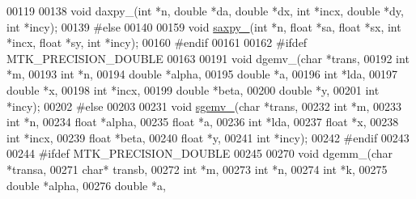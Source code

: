 \begin{DoxyCode}
00119 
00138 \textcolor{keywordtype}{void} daxpy\_(\textcolor{keywordtype}{int} *n, \textcolor{keywordtype}{double} *da, \textcolor{keywordtype}{double} *dx, \textcolor{keywordtype}{int} *incx, \textcolor{keywordtype}{double} *dy, \textcolor{keywordtype}{int} *incy);
00139 \textcolor{preprocessor}{#else}
00140 
00159 \textcolor{keywordtype}{void} \hyperlink{namespacemtk_a81a2d7d1ea9eff65ae13646c93dad5e9}{saxpy\_}(\textcolor{keywordtype}{int} *n, \textcolor{keywordtype}{float} *sa, \textcolor{keywordtype}{float} *sx, \textcolor{keywordtype}{int} *incx, \textcolor{keywordtype}{float} *sy, \textcolor{keywordtype}{int} *incy);
00160 \textcolor{preprocessor}{#endif}
00161 
00162 \textcolor{preprocessor}{#ifdef MTK\_PRECISION\_DOUBLE}
00163 
00191 \textcolor{keywordtype}{void} dgemv\_(\textcolor{keywordtype}{char} *trans,
00192             \textcolor{keywordtype}{int} *m,
00193             \textcolor{keywordtype}{int} *n,
00194             \textcolor{keywordtype}{double} *alpha,
00195             \textcolor{keywordtype}{double} *a,
00196             \textcolor{keywordtype}{int} *lda,
00197             \textcolor{keywordtype}{double} *x,
00198             \textcolor{keywordtype}{int} *incx,
00199             \textcolor{keywordtype}{double} *beta,
00200             \textcolor{keywordtype}{double} *y,
00201             \textcolor{keywordtype}{int} *incy);
00202 \textcolor{preprocessor}{#else}
00203 
00231 \textcolor{keywordtype}{void} \hyperlink{namespacemtk_a88daff7ad6f251a58b94aa2d0c94d069}{sgemv\_}(\textcolor{keywordtype}{char} *trans,
00232             \textcolor{keywordtype}{int} *m,
00233             \textcolor{keywordtype}{int} *n,
00234             \textcolor{keywordtype}{float} *alpha,
00235             \textcolor{keywordtype}{float} *a,
00236             \textcolor{keywordtype}{int} *lda,
00237             \textcolor{keywordtype}{float} *x,
00238             \textcolor{keywordtype}{int} *incx,
00239             \textcolor{keywordtype}{float} *beta,
00240             \textcolor{keywordtype}{float} *y,
00241             \textcolor{keywordtype}{int} *incy);
00242 \textcolor{preprocessor}{#endif}
00243 
00244 \textcolor{preprocessor}{#ifdef MTK\_PRECISION\_DOUBLE}
00245 
00270 \textcolor{keywordtype}{void} dgemm\_(\textcolor{keywordtype}{char} *transa,
00271             \textcolor{keywordtype}{char}* transb,
00272             \textcolor{keywordtype}{int} *m,
00273             \textcolor{keywordtype}{int} *n,
00274             \textcolor{keywordtype}{int} *k,
00275             \textcolor{keywordtype}{double} *alpha,
00276             \textcolor{keywordtype}{double} *a,

\end{DoxyCode}
